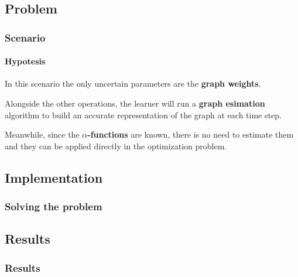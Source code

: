 
\subsection{Problem}


\begin{frame}

\frametitle{Scenario}
\framesubtitle{Hypotesis}

In this scenario the only uncertain parameters are the \textbf{graph weights}.

Alongside the other operations, the learner will run a \textbf{graph esimation} algorithm to build an accurate representation of the graph at each time step.

Meanwhile, since the \textbf{$\alpha$-functions} are known, there is no need to estimate them and they can be applied directly in the optimization problem.

\end{frame}


\subsection{Implementation}


\begin{frame}

\frametitle{Solving the problem}

\end{frame}


\subsection{Results}


\begin{frame}

\frametitle{Results}


\end{frame}

